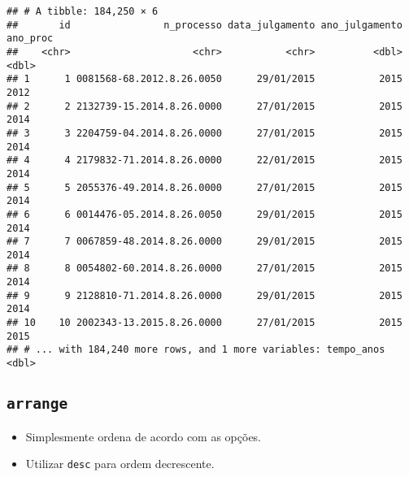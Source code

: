 \documentclass[]{book}
\newenvironment{Shaded}{\begin{snugshade}}{\end{snugshade}}
\newcommand{\KeywordTok}[1]{\textcolor[rgb]{0.13,0.29,0.53}{\textbf{{#1}}}}
\newcommand{\DataTypeTok}[1]{\textcolor[rgb]{0.13,0.29,0.53}{{#1}}}
\newcommand{\DecValTok}[1]{\textcolor[rgb]{0.00,0.00,0.81}{{#1}}}
\newcommand{\StringTok}[1]{\textcolor[rgb]{0.31,0.60,0.02}{{#1}}}
\newcommand{\NormalTok}[1]{{#1}}
\providecommand{\tightlist}{%
  \setlength{\itemsep}{0pt}\setlength{\parskip}{0pt}}
\begin{document}
\begin{Shaded}
\end{Shaded}

\begin{verbatim}
## # A tibble: 184,250 × 6
##       id                n_processo data_julgamento ano_julgamento ano_proc
##    <chr>                     <chr>           <chr>          <dbl>    <dbl>
## 1      1 0081568-68.2012.8.26.0050      29/01/2015           2015     2012
## 2      2 2132739-15.2014.8.26.0000      27/01/2015           2015     2014
## 3      3 2204759-04.2014.8.26.0000      27/01/2015           2015     2014
## 4      4 2179832-71.2014.8.26.0000      22/01/2015           2015     2014
## 5      5 2055376-49.2014.8.26.0000      27/01/2015           2015     2014
## 6      6 0014476-05.2014.8.26.0050      29/01/2015           2015     2014
## 7      7 0067859-48.2014.8.26.0000      29/01/2015           2015     2014
## 8      8 0054802-60.2014.8.26.0000      27/01/2015           2015     2014
## 9      9 2128810-71.2014.8.26.0000      29/01/2015           2015     2014
## 10    10 2002343-13.2015.8.26.0000      27/01/2015           2015     2015
## # ... with 184,240 more rows, and 1 more variables: tempo_anos <dbl>
\end{verbatim}

\subsection{\texorpdfstring{\texttt{arrange}}{arrange}}\label{arrange}

\begin{itemize}
\tightlist
\item
  Simplesmente ordena de acordo com as opções.
\item
  Utilizar \texttt{desc} para ordem decrescente.
\end{itemize}
\end{document}
